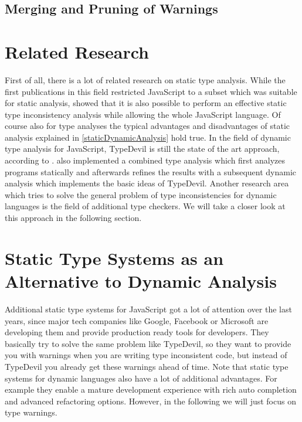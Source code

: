 \documentclass[runningheads,a4paper]{llncs}
\begin{document}
\subsection{Merging and Pruning of Warnings}


\section{Related Research}

First of all, there is a lot of related research on static type analysis.
While the first publications in this field restricted JavaScript to a subset which was suitable for static analysis, \cite{DBLP:conf/sas/JensenMT09} showed that it is also possible to perform an effective static type inconsistency analysis while allowing the whole JavaScript language.
Of course also for type analyses the typical advantages and disadvantages of static analysis explained in \ref{staticDynamicAnalysis} hold true.
In the field of dynamic type analysis for JavaScript, TypeDevil is still the state of the art approach, according to \cite{DBLP:conf/icse/TanXCLYS17}. 
\cite{DBLP:conf/icse/TanXCLYS17} also implemented a combined type analysis which first analyzes programs statically and afterwards refines the results with a subsequent dynamic analysis which implements the basic ideas of TypeDevil.
Another research area which tries to solve the general problem of type inconsistencies for dynamic languages is the field of additional type checkers.
We will take a closer look at this approach in the following section.

\section{Static Type Systems as an Alternative to Dynamic Analysis}

Additional static type systems for JavaScript got a lot of attention over the last years, since major tech companies like Google, Facebook or Microsoft are developing them and provide production ready tools for developers.
They basically try to solve the same problem like TypeDevil, so they want to provide you with warnings when you are writing type inconsistent code, but instead of TypeDevil you already get these warnings ahead of time.
Note that static type systems for dynamic languages also have a lot of additional advantages.
For example they enable a mature development experience with rich auto completion and advanced refactoring options.
However, in the following we will just focus on type warnings.
\end{document}
